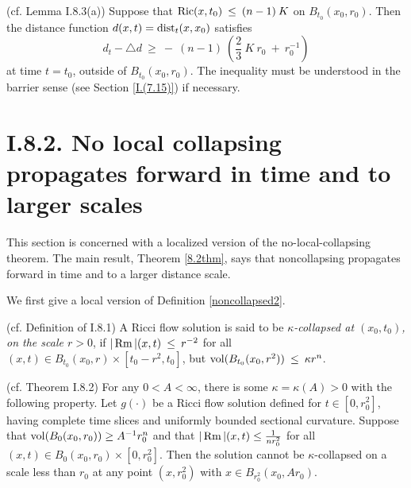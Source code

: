 \begin{lemma}
  \label{lem:kl-length-distortion-estimates-estimates-distance-distortion}
 (cf. Lemma I.8.3(a)) \label{I.8.3a}
Suppose that
$\operatorname{Ric}(x, t_0) \: \le \: (n-1) \: K$ on $B_{t_0}(x_0, r_0)$. Then
the distance function $d(x,t) = \operatorname{dist}_t(x,x_0)$ satisfies
\begin{equation}
d_t - \triangle d \: \ge \:
- \: (n-1) \: \left( \frac23 \: K \: r_0 \: + \: r_0^{-1} \right)
\end{equation}
at time $t = t_0$, outside of $B_{t_0}(x_0, r_0)$. The inequality must
be understood in the barrier sense (see Section \ref{I.(7.15)}) if
necessary.
\end{lemma}

\section{I.8.2. No local collapsing propagates forward in time and
to larger scales}

This section is concerned with a localized version of the
no-local-collapsing theorem.  The main result, Theorem \ref{8.2thm},
says that noncollapsing propagates forward in time and to a
larger distance scale.

We first give a local version of Definition \ref{noncollapsed2}.

\begin{definition}
  \label{def:kl-no-local-collapsing-propagates-forward-time-larger-scales-kappa-solutions-definition}
 (cf. Definition of I.8.1)
A Ricci flow solution is said to be {\em $\kappa$-collapsed at
$(x_0, t_0)$, on the scale $r>0$}, if $|\operatorname{Rm}|(x,t) \: \le \: r^{-2}$
for all $(x,t)\in B_{t_0}(x_0,r)\times [t_0-r^2,t_0]$,
but $\operatorname{vol}(B_{t_0}(x_0,r^2)) \: \le \:
\kappa r^n$.
\end{definition}

\begin{theorem}
  \label{thm:kl-no-local-collapsing-propagates-forward-time-larger-scales-existence-kappa-solutions}
 (cf. Theorem I.8.2) \label{8.2thm}
For any $0<A<\infty$, there is some $\kappa = \kappa(A)>0$ with
the following property.   Let
$g(\cdot)$ be a Ricci flow solution defined for
$t \in [0, r_0^2]$, having complete time slices and uniformly bounded
sectional curvature.
Suppose that $\operatorname{vol}(B_0(x_0, r_0)) \geq A^{-1} r_0^n$
and that $|\operatorname{Rm}|(x,t) \le \frac{1}{n r_0^2}$ for all
$(x,t)\in B_0(x_0,r_0)\times [0,r_0^2]$. Then the
solution cannot
be $\kappa$-collapsed on a scale less than $r_0$ at any point
$(x, r_0^2)$ with $x \in B_{r_0^2}(x_0,Ar_0)$.
\end{theorem}

